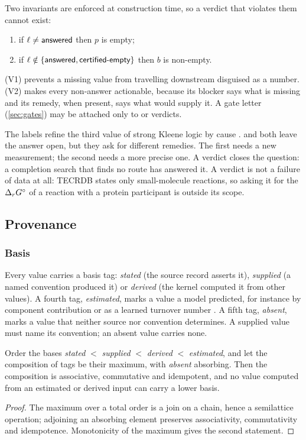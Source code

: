 Two invariants are enforced at construction time, so a verdict that violates them cannot exist:
\begin{enumerate}[label=(V\arabic*),itemsep=1pt]
  \item if $\ell\neq\textsf{answered}$ then $p$ is empty;
  \item if $\ell\notin\{\textsf{answered},\textsf{certified-empty}\}$ then $b$ is non-empty.
\end{enumerate}
(V1) prevents a missing value from travelling downstream disguised as a number.
(V2) makes every non-answer actionable, because its blocker says what is missing and its remedy, when present, says what would supply it.
A gate letter (\cref{sec:gates}) may be attached only to  or  verdicts.

The labels refine the third value of strong Kleene logic by cause \citep{kleene1952introduction}.
 and  both leave the answer open, but they ask for different remedies.
The first needs a new measurement; the second needs a more precise one.
A  verdict closes the question: a completion search that finds no route has answered it.
A  verdict is not a failure of data at all: TECRDB states only small-molecule reactions, so asking it for the $\Delta_r G^\circ$ of a reaction with a protein participant is outside its scope.

\subsection{Provenance}
\label{sec:provenance}

\subsubsection{Basis}
\label{sec:basis}

Every value carries a basis tag: \emph{stated} (the source record asserts it), \emph{supplied} (a named convention produced it) or \emph{derived} (the kernel computed it from other values).
A fourth tag, \emph{estimated}, marks a value a model predicted, for instance by component contribution \citep{noor2013component} or as a learned turnover number \citep{li2022dlkcat}.
A fifth tag, \emph{absent}, marks a value that neither source nor convention determines.
A supplied value must name its convention; an absent value carries none.

\begin{proposition}
\label{prop:basis}
Order the bases \emph{stated} $<$ \emph{supplied} $<$ \emph{derived} $<$ \emph{estimated}, and let the composition of tags be their maximum, with \emph{absent} absorbing.
Then the composition is associative, commutative and idempotent, and no value computed from an estimated or derived input can carry a lower basis.
\end{proposition}
\begin{proof}
The maximum over a total order is a join on a chain, hence a semilattice operation; adjoining an absorbing element preserves associativity, commutativity and idempotence.
Monotonicity of the maximum gives the second statement.
\end{proof}

